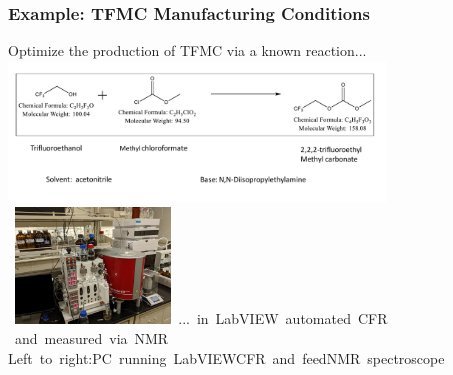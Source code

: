\documentclass[aspectratio=169]{beamer}
\begin{document}
\begin{frame}
\frametitle{Example: TFMC Manufacturing Conditions}

  \begin{center}

  Optimize the production of TFMC via a known reaction...\\
  \includegraphics[width=0.75\textwidth]{../../img/probs/basic_reaction.pdf}\\
  \hbox{
   \hskip -90pt
    \vbox{\includegraphics[width=0.31\textwidth]{../../img/probs/cfr-nmr-setup.jpg}}
    \hskip -190pt
   \vbox{... in LabVIEW automated CFR\\
    $\quad$ and measured via NMR\\
    $\quad$\\
    Left to right:\\
    PC running LabVIEW\\
    CFR and feed\\
    NMR spectroscope\\}
    }
  \end{center}
\end{frame}
\end{document}
